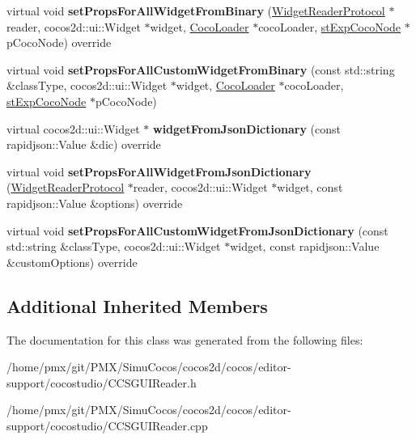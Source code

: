 \begin{DoxyCompactItemize}
\item 
\mbox{\label{classcocostudio_1_1WidgetPropertiesReader0300_a957e56608858622d0c2f06d55c32656e}} 
virtual void {\bfseries set\+Props\+For\+All\+Widget\+From\+Binary} (\hyperlink{classcocostudio_1_1WidgetReaderProtocol}{Widget\+Reader\+Protocol} $\ast$reader, cocos2d\+::ui\+::\+Widget $\ast$widget, \hyperlink{classcocostudio_1_1CocoLoader}{Coco\+Loader} $\ast$coco\+Loader, \hyperlink{structcocostudio_1_1stExpCocoNode}{st\+Exp\+Coco\+Node} $\ast$p\+Coco\+Node) override
\item 
\mbox{\label{classcocostudio_1_1WidgetPropertiesReader0300_a2b975e01281c7fe9a57563b6f9157d84}} 
virtual void {\bfseries set\+Props\+For\+All\+Custom\+Widget\+From\+Binary} (const std\+::string \&class\+Type, cocos2d\+::ui\+::\+Widget $\ast$widget, \hyperlink{classcocostudio_1_1CocoLoader}{Coco\+Loader} $\ast$coco\+Loader, \hyperlink{structcocostudio_1_1stExpCocoNode}{st\+Exp\+Coco\+Node} $\ast$p\+Coco\+Node)
\item 
\mbox{\label{classcocostudio_1_1WidgetPropertiesReader0300_a6a22ee19e7ae057ab8133b873a82783d}} 
virtual cocos2d\+::ui\+::\+Widget $\ast$ {\bfseries widget\+From\+Json\+Dictionary} (const rapidjson\+::\+Value \&dic) override
\item 
\mbox{\label{classcocostudio_1_1WidgetPropertiesReader0300_a6e96b632d20e1f5e273170c24e1b9038}} 
virtual void {\bfseries set\+Props\+For\+All\+Widget\+From\+Json\+Dictionary} (\hyperlink{classcocostudio_1_1WidgetReaderProtocol}{Widget\+Reader\+Protocol} $\ast$reader, cocos2d\+::ui\+::\+Widget $\ast$widget, const rapidjson\+::\+Value \&options) override
\item 
\mbox{\label{classcocostudio_1_1WidgetPropertiesReader0300_ae20a61f4fe63ed9cf5e50cc0e49289fd}} 
virtual void {\bfseries set\+Props\+For\+All\+Custom\+Widget\+From\+Json\+Dictionary} (const std\+::string \&class\+Type, cocos2d\+::ui\+::\+Widget $\ast$widget, const rapidjson\+::\+Value \&custom\+Options) override
\end{DoxyCompactItemize}
\subsection*{Additional Inherited Members}


The documentation for this class was generated from the following files\+:\begin{DoxyCompactItemize}
\item 
/home/pmx/git/\+P\+M\+X/\+Simu\+Cocos/cocos2d/cocos/editor-\/support/cocostudio/C\+C\+S\+G\+U\+I\+Reader.\+h\item 
/home/pmx/git/\+P\+M\+X/\+Simu\+Cocos/cocos2d/cocos/editor-\/support/cocostudio/C\+C\+S\+G\+U\+I\+Reader.\+cpp\end{DoxyCompactItemize}
